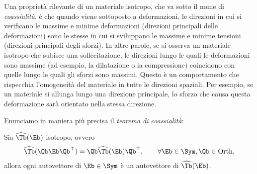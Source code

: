 Una proprietà rilevante di un materiale isotropo, che va sotto il nome di \textit{coassialità}, è che 
quando  viene sottoposto a deformazioni, le direzioni in cui si verificano le massime e minime deformazioni (direzioni principali delle deformazioni) sono le stesse in cui si sviluppano le massime e minime tensioni (direzioni principali degli sforzi). In altre parole, se si osserva un materiale isotropo che subisce una sollecitazione, le direzioni lungo le quali le deformazioni sono massime (ad esempio, la dilatazione o la compressione) coincidono con quelle lungo le quali gli sforzi sono massimi. Questo è un comportamento che rispecchia l'omogeneità del materiale in tutte le direzioni spaziali. Per esempio, se un materiale si allunga lungo una direzione principale, lo sforzo che causa questa deformazione sarà orientato nella stessa direzione.

Enunciamo in maniera più precisa il \textit{teorema di coassialità}:
\begin{definition}
Sia $\widehat{\Tb}(\Eb)$ isotropo, ovvero
\begin{equation}
	\widehat{\Tb}(\Qb \Eb \Qb ^\top)=\Qb \widehat{\Tb}(\Eb)\Qb ^\top, \qquad \forall \Eb \in \Sym, \Qb \in {\rm Orth},
\end{equation}
allora ogni autovettore di $\Eb\in \Sym$ è un autovettore di $\widehat{\Tb}(\Eb)$.
\end{definition}


